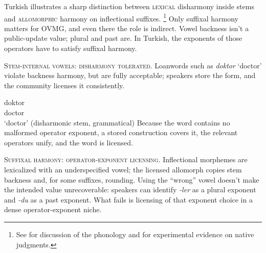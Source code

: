 \documentclass[12pt,letterpaper]{article}
\newcommand{\term}[1]{\textsc{#1}}
\newcommand{\mention}[1]{\textit{#1}}
\begin{document}
Turkish illustrates a sharp distinction between \term{lexical} disharmony inside stems and
\term{allomorphic} harmony on inflectional suffixes.%
\footnote{See \autocite{Sezer1981,KabakVogel2001} for discussion of the phonology and \autocite{Arik2015} for experimental evidence on native judgments.}
Only suffixal harmony matters for OVMG, and even there the role is indirect.
Vowel backness isn't a public-update value; plural and past are. In Turkish,
the exponents of those operators have to satisfy suffixal harmony.

\noindent\textsc{Stem-internal vowels: disharmony tolerated.} Loanwords such as
\mention{doktor} `doctor' violate backness harmony, but are fully acceptable;
speakers store the form, and the community licenses it consistently.

\ea \label{ex:doktor}
\gll doktor \\
     doctor\\
\glt `doctor' (disharmonic stem, grammatical)
\z
Because the word contains no malformed operator exponent, a stored construction
covers it, the relevant operators unify, and the word is licensed.

\noindent\textsc{Suffixal harmony: operator-exponent licensing.} Inflectional morphemes are lexicalized with an underspecified vowel; the licensed allomorph copies stem backness and, for some suffixes, rounding. Using the \enquote{wrong} vowel doesn't make the intended value unrecoverable: speakers can identify \mention{-ler} as a plural exponent and \mention{-du} as a past exponent. What fails is licensing of that exponent choice in a dense operator-exponent niche.

\ea  \label{ex:kitap-pl}
\z
\z

\ea \label{ex:gul-past}
\z
\z
\end{document}
